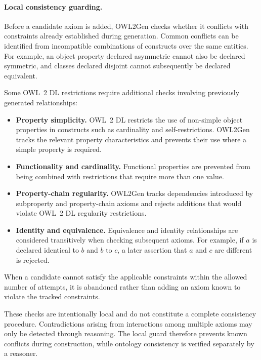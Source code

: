 \paragraph{Local consistency guarding.}

Before a candidate axiom is added, OWL2Gen checks whether it conflicts with
constraints already established during generation. Common conflicts can be
identified from incompatible combinations of constructs over the same
entities. For example, an object property declared asymmetric cannot also
be declared symmetric, and classes declared disjoint cannot subsequently
be declared equivalent.

Some OWL~2 DL restrictions require additional checks involving previously
generated relationships:

\begin{itemize}

\item \textbf{Property simplicity.}
OWL~2 DL restricts the use of non-simple object properties in constructs
such as cardinality and self-restrictions. OWL2Gen tracks the relevant
property characteristics and prevents their use where a simple property
is required.

\item \textbf{Functionality and cardinality.}
Functional properties are prevented from being combined with restrictions
that require more than one value.

\item \textbf{Property-chain regularity.}
OWL2Gen tracks dependencies introduced by subproperty and property-chain
axioms and rejects additions that would violate OWL~2 DL regularity
restrictions.

\item \textbf{Identity and equivalence.}
Equivalence and identity relationships are considered transitively when
checking subsequent axioms. For example, if $a$ is declared identical to
$b$ and $b$ to $c$, a later assertion that $a$ and $c$ are different is
rejected.

\end{itemize}

When a candidate cannot satisfy the applicable constraints within the
allowed number of attempts, it is abandoned rather than adding an axiom
known to violate the tracked constraints.

These checks are intentionally local and do not constitute a complete
consistency procedure. Contradictions arising from interactions among
multiple axioms may only be detected through reasoning. The local guard
therefore prevents known conflicts during construction, while ontology
consistency is verified separately by a reasoner.


